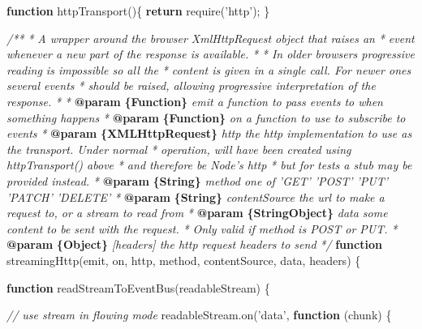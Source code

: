 \documentclass[]{article}
\newenvironment{Shaded}{}{}
\newcommand{\KeywordTok}[1]{\textcolor[rgb]{0.00,0.44,0.13}{\textbf{{#1}}}}
\newcommand{\StringTok}[1]{\textcolor[rgb]{0.25,0.44,0.63}{{#1}}}
\newcommand{\CommentTok}[1]{\textcolor[rgb]{0.38,0.63,0.69}{\textit{{#1}}}}
\newcommand{\OtherTok}[1]{\textcolor[rgb]{0.00,0.44,0.13}{{#1}}}
\newcommand{\FunctionTok}[1]{\textcolor[rgb]{0.02,0.16,0.49}{{#1}}}
\newcommand{\NormalTok}[1]{{#1}}
\begin{document}
\begin{Shaded}
\begin{Highlighting}[]
\KeywordTok{function} \FunctionTok{httpTransport}\NormalTok{()\{}
   \KeywordTok{return} \FunctionTok{require}\NormalTok{(}\StringTok{'http'}\NormalTok{);}
\NormalTok{\}}

\CommentTok{/**}
\CommentTok{ * A wrapper around the browser XmlHttpRequest object that raises an }
\CommentTok{ * event whenever a new part of the response is available.}
\CommentTok{ * }
\CommentTok{ * In older browsers progressive reading is impossible so all the }
\CommentTok{ * content is given in a single call. For newer ones several events}
\CommentTok{ * should be raised, allowing progressive interpretation of the response.}
\CommentTok{ *      }
\CommentTok{ * }\KeywordTok{@param}\CommentTok{ }\KeywordTok{\{Function\}}\CommentTok{ emit a function to pass events to when something happens}
\CommentTok{ * }\KeywordTok{@param}\CommentTok{ }\KeywordTok{\{Function\}}\CommentTok{ on a function to use to subscribe to events}
\CommentTok{ * }\KeywordTok{@param}\CommentTok{ }\KeywordTok{\{XMLHttpRequest\}}\CommentTok{ http the http implementation to use as the transport. Under normal}
\CommentTok{ *          operation, will have been created using httpTransport() above}
\CommentTok{ *          and therefore be Node's http}
\CommentTok{ *          but for tests a stub may be provided instead.}
\CommentTok{ * }\KeywordTok{@param}\CommentTok{ }\KeywordTok{\{String\}}\CommentTok{ method one of 'GET' 'POST' 'PUT' 'PATCH' 'DELETE'}
\CommentTok{ * }\KeywordTok{@param}\CommentTok{ }\KeywordTok{\{String\}}\CommentTok{ contentSource the url to make a request to, or a stream to read from}
\CommentTok{ * }\KeywordTok{@param}\CommentTok{ }\KeywordTok{\{String\textbar{}Object\}}\CommentTok{ data some content to be sent with the request.}
\CommentTok{ *                        Only valid if method is POST or PUT.}
\CommentTok{ * }\KeywordTok{@param}\CommentTok{ }\KeywordTok{\{Object\}}\CommentTok{ [headers] the http request headers to send                       }
\CommentTok{ */}  
\KeywordTok{function} \FunctionTok{streamingHttp}\NormalTok{(emit, on, http, method, contentSource, data, headers) \{}

   \KeywordTok{function} \FunctionTok{readStreamToEventBus}\NormalTok{(readableStream) \{}
         
      \CommentTok{// use stream in flowing mode   }
      \OtherTok{readableStream}\NormalTok{.}\FunctionTok{on}\NormalTok{(}\StringTok{'data'}\NormalTok{, }\KeywordTok{function} \NormalTok{(chunk) \{}
                                             

\end{Highlighting}
\end{Shaded}
\end{document}
